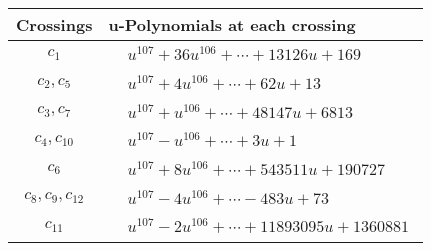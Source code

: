 \documentclass[1p]{elsarticle_modified}
\theoremstyle{definition}
\begin{document}
\begin{tabular}{m{50pt}|m{274pt}}
Crossings & \hspace{64pt}u-Polynomials at each crossing \\
\hline $$\begin{aligned}c_{1}\end{aligned}$$&$\begin{aligned}
&u^{107}+36 u^{106}+\cdots+13126 u+169
\end{aligned}$\\
\hline $$\begin{aligned}c_{2},c_{5}\end{aligned}$$&$\begin{aligned}
&u^{107}+4 u^{106}+\cdots+62 u+13
\end{aligned}$\\
\hline $$\begin{aligned}c_{3},c_{7}\end{aligned}$$&$\begin{aligned}
&u^{107}+u^{106}+\cdots+48147 u+6813
\end{aligned}$\\
\hline $$\begin{aligned}c_{4},c_{10}\end{aligned}$$&$\begin{aligned}
&u^{107}- u^{106}+\cdots+3 u+1
\end{aligned}$\\
\hline $$\begin{aligned}c_{6}\end{aligned}$$&$\begin{aligned}
&u^{107}+8 u^{106}+\cdots+543511 u+190727
\end{aligned}$\\
\hline $$\begin{aligned}c_{8},c_{9},c_{12}\end{aligned}$$&$\begin{aligned}
&u^{107}-4 u^{106}+\cdots-483 u+73
\end{aligned}$\\
\hline $$\begin{aligned}c_{11}\end{aligned}$$&$\begin{aligned}
&u^{107}-2 u^{106}+\cdots+11893095 u+1360881
\end{aligned}$\\
\hline
\end{tabular}\\~\\
\end{document}
